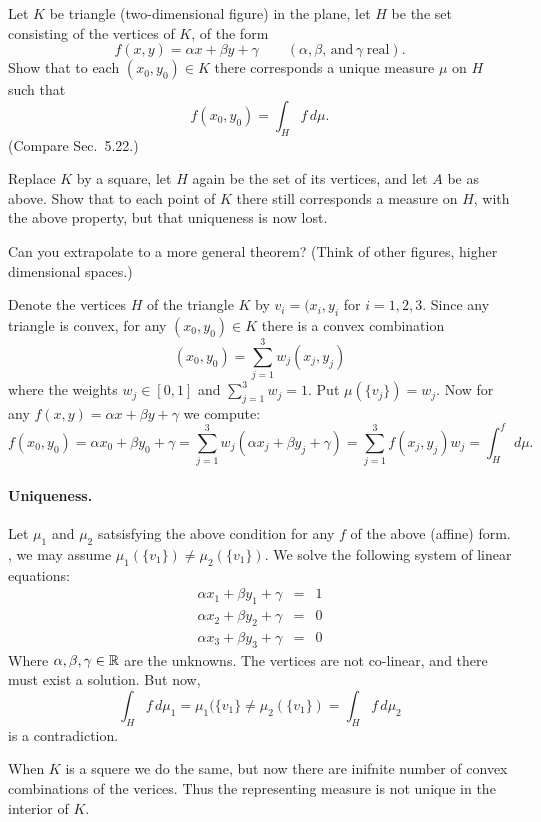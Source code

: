 \begin{enumerate}
\begin{excopy}
Let $K$ be triangle (two-dimensional figure) in the plane,
let $H$ be the set consisting of the vertices of $K$, of the form
\[ f(x,y) = \alpha x + \beta y + \gamma
   \qquad (\alpha, \beta,\, \textrm{and}\, \gamma\; \textrm{real}). \]
Show that to each \((x_0,y_0)\in K\) there corresponds
a unique measure \(\mu\) on $H$ such that
\[ f(x_0,y_0) = \int_H f\,d\mu. \]
(Compare Sec.~5.22.)

Replace $K$ by a square, let $H$ again be the set of its vertices, and let $A$
be as above.
Show that to each point of $K$ there still corresponds a measure on $H$,
with the above property, but that uniqueness is now lost.

Can you extrapolate to a more general theorem?
(Think of other figures, higher dimensional spaces.)
\end{excopy}

Denote the vertices $H$ of the triangle $K$ 
by \(v_i = (x_i,y_i\) for \(i=1,2,3\).
Since any triangle is convex, 
for any \((x_0,y_0)\in K\) there is a convex combination
\[(x_0,y_0) = \sum_{j=1}^3 w_j(x_j,y_j)\]
where the weights \(w_j\in[0,1]\) and \(\sum_{j=1}^3 w_j = 1\).
Put \(\mu(\{v_j\}) = w_j\). 
Now for any \(f(x,y) = \alpha x + \beta y + \gamma\) 
we compute:
\[
f(x_0,y_0)
 = \alpha x_0 + \beta y_0 + \gamma 
 = \sum_{j=1}^3  w_j (\alpha x_j + \beta y_j + \gamma) 
 = \sum_{j=1}^3 f(x_j,y_j) w_j 
 = \int_H^f\,d\mu.
\]

\paragraph{Uniqueness.} Let \(\mu_1\) and \(\mu_2\)
satsisfying the above condition for any $f$ of the above (affine) form.
\Wlogy, we may assume \(\mu_1(\{v_1\}) \neq \mu_2(\{v_1\})\).
We solve the following system of linear equations:
\begin{eqnarray*}
\alpha x_1 + \beta y_1 + \gamma &=& 1 \\
\alpha x_2 + \beta y_2 + \gamma &=& 0 \\
\alpha x_3 + \beta y_3 + \gamma &=& 0
\end{eqnarray*}
Where \(\alpha,\beta,\gamma\in\mathbb{R}\) are the unknowns.
The vertices are not co-linear, and there must exist a solution.
But now,
\[\int_H f\,d\mu_1 = \mu_1(\{v_1\} \neq \mu_2(\{v_1\}) = \int_H f\,d\mu_2\]
is a contradiction.

When $K$ is a squere we do the same, but now there are 
inifnite number of convex combinations of the verices.
Thus the representing measure is not unique in the interior of $K$.


\end{enumerate}
